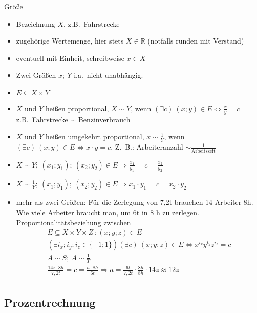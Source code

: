 Größe
\begin{itemize}
    \item Bezeichnung $X$, z.B.\ Fahrstrecke
    \item zugehörige Wertemenge, hier stets $X\in \mathbb{R}$ (notfalls runden mit Verstand)
    \item eventuell mit Einheit, schreibweise $x \in X$
    \item Zwei Größen $x;\ Y$ i.a.\ nicht unabhängig.
    \item $E \subseteq X \times Y$
    \item $X$ und $Y$ heißen proportional, $X \sim Y$, wenn $(\exists c)\ (x;y) \in E \Leftrightarrow \frac{x}{y}=c$ z.B.\ Fahrstrecke $\sim$ Benzinverbrauch
    \item $X$ und $Y$ heißen umgekehrt proportional, $x \sim \frac{1}{Y}$, wenn $(\exists c)\ (x;y) \in E \Leftrightarrow x \cdot y = c$.
    Z.~B.: Arbeiteranzahl $\sim \frac{1}{\textrm{Arbeitszeit}}$
    \item $X \sim Y;\ (x_1;y_1);\ (x_2;y_2) \in E \Rightarrow \frac{x_1}{y_1} = c = \frac{x_2}{y_2}$
    \item $X \sim \frac{1}{Y};\ (x_1;y_1);\ (x_2;y_2) \in E \Rightarrow x_1 \cdot y_1 = c = x_2 \cdot y_2$
    \item mehr als zwei Größen: Für die Zerlegung von 7,2t brauchen 14 Arbeiter 8h.
    Wie viele Arbeiter braucht man, um 6t in 8 h zu zerlegen. \\
    Proportionalitätsbeziehung zwischen \begin{gather*}
                                            E \subseteq X \times  Y \times Z\ : (x; y; z) \in E\\
                                            (\exists i_x; i_y; i_z \in \lbrace -1; 1 \rbrace) (\exists c)\ (x;y;z) \in E \Leftrightarrow x^{i_x}y^{i_y}z^{i_z} = c\\
                                            A \sim S;\ A \sim \frac{1}{T}\\
                                            \frac{14z \cdot 8h}{7{,}2t}=c=\frac{a \cdot 8h}{6t} \Rightarrow a = \frac{6t}{7{,}2t}\cdot \frac{8h}{8h} \cdot 14z \approx 12z\\
    \end{gather*}
\end{itemize}

\subsection{Prozentrechnung}\label{subsec:proportionalitat_prozentrechnung}

